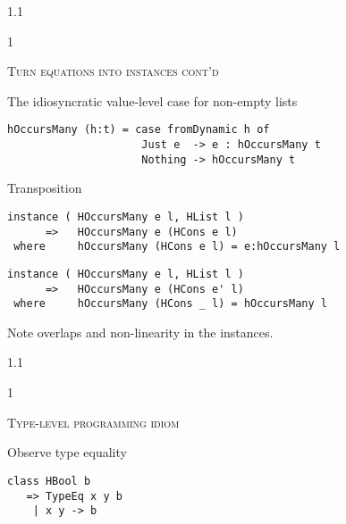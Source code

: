 \documentclass{slides}
\newcommand{\header}[1]{{\large\scshape \color{Red} #1} \medskip }
\newcommand{\blau}[1]{{\color{Blue} #1} \medskip }
\newenvironment{myslide}{\begin{slide}\color{Blue}\begin{boxedminipage}{1.1\hsize}\begin{boxedminipage}{1\hsize}\color{Black}
\vspace{-170\in}
}{%
\smallskip
\end{boxedminipage}
\end{boxedminipage}
\end{slide}}
\begin{document}
\begin{myslide}

\header{Turn equations into instances cont'd}

\blau{The idiosyncratic value-level case for non-empty lists}

\begin{Verbatim}[fontseries=normal,fontsize=\tiny]
hOccursMany (h:t) = case fromDynamic h of
                     Just e  -> e : hOccursMany t
                     Nothing -> hOccursMany t
\end{Verbatim}

\medskip

\blau{Transposition}

\begin{Verbatim}[fontseries=normal,fontsize=\tiny]
instance ( HOccursMany e l, HList l )
      =>   HOccursMany e (HCons e l)
 where     hOccursMany (HCons e l) = e:hOccursMany l
\end{Verbatim}
 
\begin{Verbatim}[fontseries=normal,fontsize=\tiny]
instance ( HOccursMany e l, HList l )
      =>   HOccursMany e (HCons e' l)
 where     hOccursMany (HCons _ l) = hOccursMany l
\end{Verbatim}

\medskip

{\small

Note overlaps and non-linearity in the instances.

}

\end{myslide}






\begin{myslide}

\header{Type-level programming idiom}

\blau{Observe type equality}

\bigskip

\begin{Verbatim}[fontseries=normal,fontsize=\small]
class HBool b
   => TypeEq x y b
    | x y -> b
\end{Verbatim}


\end{myslide}



\end{document}
